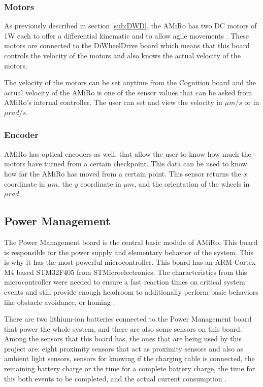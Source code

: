 \documentclass[12pt]{report}%
\begin{document}
\subsubsection{Motors}
As previously described in section \ref{sub:DWD}, the AMiRo has two DC motors of 1W each to offer a differential kinematic and to allow agile movements \cite{AMiRo_paper_modular}. These motors are connected to the DiWheelDrive board which means that this board controls the velocity of the motors and also knows the actual velocity of the motors.

The velocity of the motors can be set anytime from the Cognition board and the actual velocity of the AMiRo is one of the sensor values that can be asked from AMiRo's internal controller. The user can set and view the velocity in $\mu m/s$ or in $\mu rad/s$.

\subsubsection{Encoder}
AMiRo has optical encoders as well, that allow the user to know how much the motors have turned from a certain checkpoint. This data can be used to know how far the AMiRo has moved from a certain point. This sensor returns the $x$ coordinate in $\mu m$, the $y$ coordinate in $\mu m$, and the orientation of the wheels in $\mu rad$.

\subsection{Power Management}
\label{PWB}
The Power Management board is the central basic module of AMiRo. This board is responsible for the power supply and elementary behavior of the system. This is why it has the most powerful microcontroller. This board has an ARM Cortex-M4 based STM32F405 from STMicroelectronics. The characteristics from this microcontroller were needed to ensure a fast reaction times on critical system events and still provide enough headroom to additionally perform basic behaviors like obstacle avoidance, or homing \cite{AMiRo_paper_modular}.

There are two lithium-ion batteries connected to the Power Management board that power the whole system, and there are also some sensors on this board. Among the sensors that this board has, the ones that are being used by this project are: eight proximity sensors that act as proximity sensors and also as ambient light sensors, sensors for knowing if the charging cable is connected, the remaining battery charge or the time for a complete battery charge, the time for this both events to be completed, and the actual current consumption  \cite{AMiRo_paper_modular}.
\end{document}
